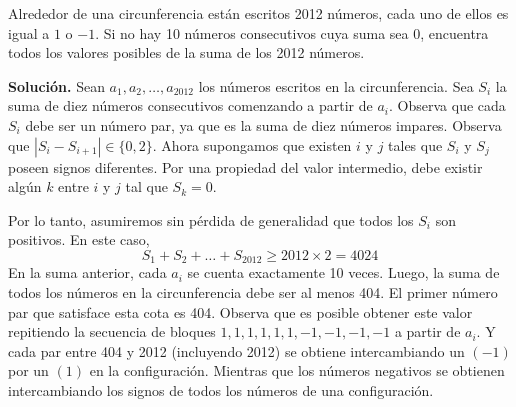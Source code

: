 \documentclass[11pt]{scrartcl}
\begin{document}
\begin{example} Alrededor de una circunferencia están escritos 2012 números, cada uno de ellos es igual a $1$ o $-1$. Si no hay 10 números consecutivos cuya suma sea $0$, encuentra todos los valores posibles de la suma de los 2012 números.
\end{example}
\textbf{Solución.} Sean $a_1, a_2, \dots, a_{2012}$ los números escritos en la circunferencia. Sea $S_i$ la suma de diez números consecutivos comenzando a partir de $a_i$. Observa que cada $S_i$ debe ser un número par, ya que es la suma de diez números impares. Observa que $|S_i - S_{i+1}| \in \{0, 2\}$. Ahora supongamos que existen $i$ y $j$ tales que $S_i$ y $S_j$ poseen signos diferentes. Por una propiedad del valor intermedio, debe existir algún $k$ entre $i$ y $j$ tal que $S_k = 0$.

Por lo tanto, asumiremos sin pérdida de generalidad que todos los $S_i$ son positivos. En este caso,
\[
S_1 + S_2 + \dots + S_{2012} \geq 2012 \times 2 = 4024
\]
En la suma anterior, cada $a_i$ se cuenta exactamente 10 veces. Luego, la suma de todos los números en la circunferencia debe ser al menos 404. El primer número par que satisface esta cota es 404. Observa que es posible obtener este valor repitiendo la secuencia de bloques $1, 1, 1, 1, 1, 1, -1, -1, -1, -1$ a partir de $a_i$. Y cada par entre 404 y 2012 (incluyendo 2012) se obtiene intercambiando un $(-1)$ por un $(1)$ en la configuración. Mientras que los números negativos se obtienen intercambiando los signos de todos los números de una configuración.
\end{document}
